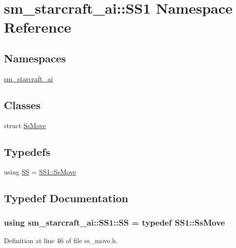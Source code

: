 \hypertarget{namespacesm__starcraft__ai_1_1SS1}{}\section{sm\+\_\+starcraft\+\_\+ai\+:\+:S\+S1 Namespace Reference}
\label{namespacesm__starcraft__ai_1_1SS1}
\subsection*{Namespaces}
\begin{DoxyCompactItemize}
\item 
 \hyperlink{namespacesm__starcraft__ai_1_1SS1_1_1sm__starcraft__ai}{sm\+\_\+starcraft\+\_\+ai}
\end{DoxyCompactItemize}
\subsection*{Classes}
\begin{DoxyCompactItemize}
\item 
struct \hyperlink{structsm__starcraft__ai_1_1SS1_1_1SsMove}{Ss\+Move}
\end{DoxyCompactItemize}
\subsection*{Typedefs}
\begin{DoxyCompactItemize}
\item 
using \hyperlink{namespacesm__starcraft__ai_1_1SS1_a4ff0721435c0672497739bcd032777ca}{SS} = \hyperlink{structsm__starcraft__ai_1_1SS1_1_1SsMove}{S\+S1\+::\+Ss\+Move}
\end{DoxyCompactItemize}


\subsection{Typedef Documentation}
\subsubsection[{\texorpdfstring{SS}{SS}}]{\setlength{\rightskip}{0pt plus 5cm}using {\bf sm\+\_\+starcraft\+\_\+ai\+::\+S\+S1\+::\+SS} = typedef {\bf S\+S1\+::\+Ss\+Move}}\hypertarget{namespacesm__starcraft__ai_1_1SS1_a4ff0721435c0672497739bcd032777ca}{}\label{namespacesm__starcraft__ai_1_1SS1_a4ff0721435c0672497739bcd032777ca}


Definition at line 46 of file ss\+\_\+move.\+h.

